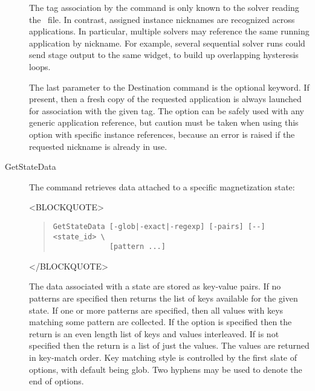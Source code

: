 \begin{description}
The tag association by the  command is only known to the
solver reading the \MIF\ file.  In contrast, assigned instance nicknames
are recognized across applications.  In particular, multiple solvers may
reference the same running application by nickname.  For example,
several sequential solver runs could send stage output to the same
 widget, to build up overlapping hysteresis loops.

The last parameter to the Destination command is the optional
 keyword.  If present, then a fresh copy of the requested
application is always launched for association with the given tag.  The
 option can be safely used with any generic application
reference, but caution must be taken when using this option with
specific instance references, because an error is raised if the
requested nickname is already in use.

\item[GetStateData\label{html:GetStateData}]
The  command retrieves data attached to a specific
magnetization state:
\begin{rawhtml}
<BLOCKQUOTE>
\end{rawhtml}
\begin{quote}
\begin{verbatim}
GetStateData [-glob|-exact|-regexp] [-pairs] [--] <state_id> \
             [pattern ...]
\end{verbatim}
\end{quote}
\begin{rawhtml}
</BLOCKQUOTE>
\end{rawhtml}
The data associated with a state are stored as key-value pairs.
If no patterns are specified then  returns the list of
keys available for the given state.  If one or more patterns are
specified, then all values with keys matching some pattern are
collected.  If the  option is specified then the return is an
even length list of keys and values interleaved.  If \cd{-pairs} is not
specified then the return is a list of just the values.  The values are
returned in key-match order.  Key matching style is controlled by the
first slate of options, with default being glob.  Two hyphens may be
used to denote the end of options.


\end{description}
